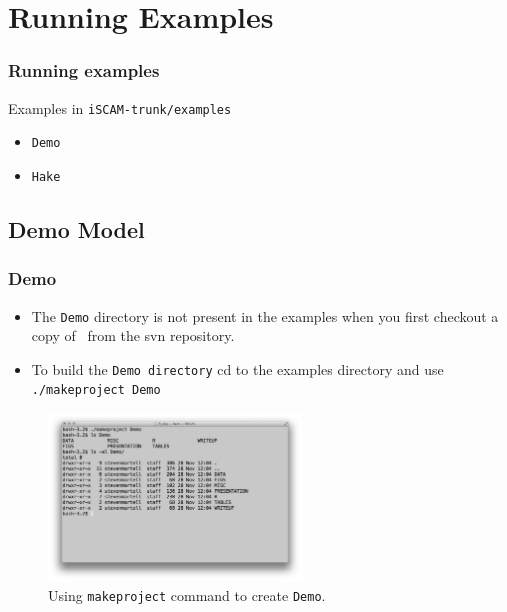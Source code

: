 
\section{Running Examples} %
\label{sec:running_examples}
\begin{frame}
	\frametitle{Running examples}
	Examples in \texttt{iSCAM-trunk/examples}
	\begin{itemize}
		\item \texttt{Demo}
		\item \texttt{Hake}
	\end{itemize}
\end{frame}

\subsection{Demo Model} %
\label{sub:demo_model}


\begin{frame}
	\frametitle{Demo}
	\begin{itemize}
		\item The \texttt{Demo} directory is not present in the examples when you first checkout a copy of \iscam\ from the svn repository.
		\item To build the \texttt{Demo directory} cd to the examples directory and use \texttt{./makeproject Demo}
	\end{itemize}

\begin{figure}[htbp]
	\centering
		\includegraphics[height=1.75in]{screenCaptures/TermDemo.pdf}
	\caption{Using \texttt{makeproject} command to create \texttt{Demo}.}
	\label{fig:screenCaptures_TermDemo}
\end{figure}
\end{frame}

